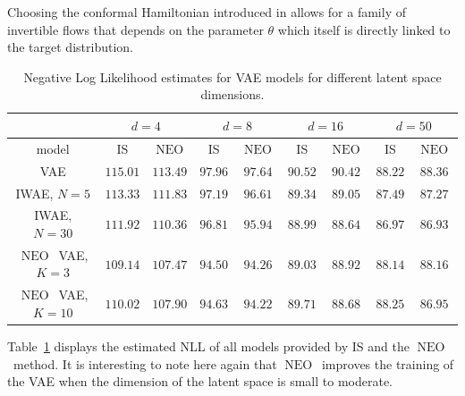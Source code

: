 \documentclass{article}
\def\IFIS{\ensuremath{\operatorname{NEO}}}
\def\InFiNE{{\small \IFIS}}
\newcommand{\1}{\mathds{1}}
\begin{document}
Choosing the conformal Hamiltonian introduced in  allows for a family of invertible flows that depends on the parameter $\theta$ which itself is directly linked to the target distribution.
\begin{table}[!t]
\centering
\caption{Negative Log Likelihood estimates for VAE models for different latent space dimensions.}
\label{tab:vae_results2}
\begin{tabular}{c|c|c||c|c||c|c||c|c|}
\cline{2-9}
 & \multicolumn{2}{c||}{$d = 4$} & \multicolumn{2}{c||}{$d = 8$} & \multicolumn{2}{c||}{$d = 16$} & \multicolumn{2}{c|}{$d = 50$} \\ \hline
\multicolumn{1}{|c|}{model} & IS & \InFiNE  & IS & \InFiNE& IS  & \InFiNE & IS & \InFiNE \\ \hline
\multicolumn{1}{|c|}{VAE} & $115.01$&$113.49$&$97.96$&$97.64$&$90.52$&$90.42$&$88.22$&$88.36$\\
\multicolumn{1}{|c|}{IWAE, $N=5$} & $113.33$&$111.83$&$97.19$&$96.61$&$89.34$&$89.05$&$87.49$&$87.27$ \\ 
\multicolumn{1}{|c|}{IWAE, $N=30$} & $111.92$&$110.36$&$96.81$&$95.94$&$88.99$&$88.64$&$86.97$&$86.93$ \\ \hline
\multicolumn{1}{|c|}{\InFiNE\ VAE, $K=3$} & $109.14$&$107.47$&$94.50$&$94.26$&$89.03$&$88.92$&$88.14$&$88.16$ \\
\multicolumn{1}{|c|}{\InFiNE\ VAE, $K=10$} & $110.02$&$107.90$&$94.63$&$94.22$&$89.71$&$88.68$&$88.25$&$86.95$ \\ \hline
\end{tabular}
\end{table}
Table~\ref{tab:vae_results2} displays the estimated NLL of all models provided by IS and the \InFiNE\ method. It is interesting to note here again that \InFiNE\ improves the training of the VAE when the dimension of the latent space is small to moderate. 
\end{document}
